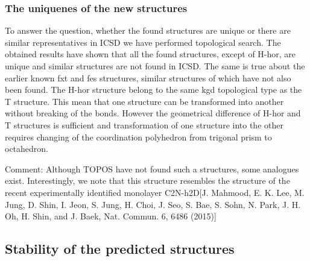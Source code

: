 \documentclass[a4paperm]{article}
\begin{document}
\subsubsection{The uniquenes of the new structures}

To answer the question, whether the found structures are unique or there are similar representatives in ICSD we have performed topological search.
The obtained results have shown that all the found structures, except of H-hor, are unique and similar structures are not found in ICSD.
The same is true about the earlier known fxt and fes structures, similar structures of which have not also been found. 
The H-hor structure belong to the same kgd topological type as the T structure.
This mean that one structure can be transformed into another without breaking of the bonds.
However the geometrical difference of H-hor and T structures is sufficient and transformation of one structure into the other requires changing of the coordination polyhedron from trigonal prism to octahedron.

Comment:
Although TOPOS have not found such a structures, some analogues exist.
Interestingly, we note that this structure resembles the structure of the recent experimentally identified monolayer C2N-h2D[J. Mahmood, E. K. Lee, M. Jung, D. Shin, I. Jeon, S. Jung, H. Choi, J. Seo, S. Bae, S. Sohn, N. Park, J. H. Oh, H. Shin, and J.
Baek, Nat. Commun. 6, 6486 (2015)]

\subsection{Stability of the predicted structures}
\end{document}
